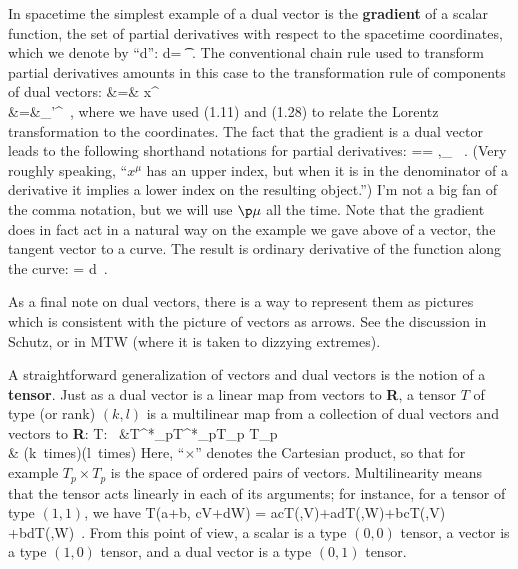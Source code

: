 In spacetime the simplest example of a dual vector is the {\bf gradient}
of a scalar function, the set of partial derivatives with respect to the
spacetime coordinates, which we denote by ``d'':
\be
  {\rm d}\phi = {{\p{}\phi}} \t\mu\ .\label{1.40}
\ee
The conventional chain rule used to transform partial derivatives
amounts in this case to the transformation rule of components of dual
vectors:
\bea
  {{\p{}\phi}} &=&
  {{\p{}x^\mu}}{{\p{}\phi}}\nonumber \\
  &=&\Lambda_{\mu'}{}^\ ,
  \label{1.41}
\eea
where we have used (1.11) and (1.28) to relate the Lorentz transformation
to the coordinates.  The fact that the gradient is a dual vector leads
to the following shorthand notations for partial derivatives:
\be
  {{\p{}\phi}}=\p\mu\phi = \phi,{}_\mu
  \ .\label{1.42}
\ee
(Very roughly speaking, ``$x^\mu$ has an upper index, but when it is in 
the denominator of a derivative it implies a lower index on the resulting 
object.'') I'm not a big fan of the comma notation, but we will use $\p\mu$ 
all the time.  Note that the gradient does in fact act in a natural way
on the example we gave above of a vector, the tangent vector to a curve.
The result is ordinary derivative of the function along the curve:
\be
  \p\mu{}
  = {{d\phi}}\ .\label{1.43}
\ee

As a final note on dual vectors, there is a way to represent them as
pictures which is consistent with the picture of vectors as arrows.
See the discussion in Schutz, or in MTW (where it is taken to dizzying
extremes).

A straightforward generalization of vectors and dual vectors is the notion
of a {\bf tensor}.  Just as a dual vector is a linear map from vectors
to {\bf R}, a tensor $T$ of type (or rank) $(k,l)$ is a multilinear map 
from a collection of dual vectors and vectors to {\bf R}:
\bea
  T:~ &T^*_p\times\cdots\times T^*_p\times T_p\times\cdots
  \times T_p \nonumber \\
  & (k~{\rm times})\qquad\quad (l~{\rm times}) \label{1.44}
\eea
Here, ``$\times$'' denotes the Cartesian product, so that for example
$T_p\times T_p$ is the space of ordered pairs of vectors.  
Multilinearity means that the tensor acts linearly in each
of its arguments; for instance, for a tensor of type $(1,1)$, we have
\be
  T(a\omega+b\eta, cV+dW) = acT(\omega,V)+adT(\omega,W)+bcT(\eta,V)
  +bdT(\eta,W)\ .\label{1.45}
\ee
From this point of view, a scalar is a type $(0,0)$ tensor, a vector
is a type $(1,0)$ tensor, and a dual vector is a type $(0,1)$ tensor.

